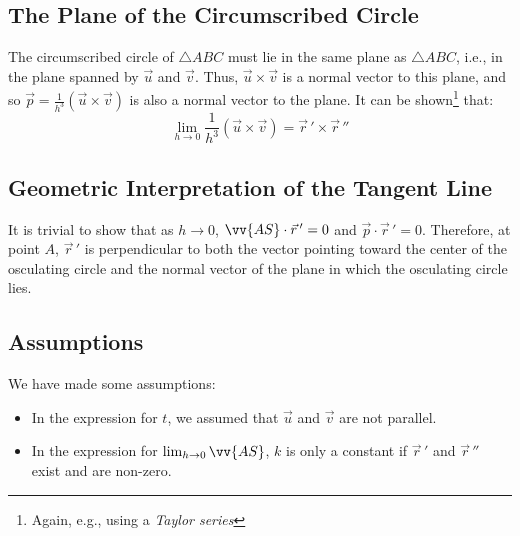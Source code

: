 	\subsection*{The Plane of the Circumscribed Circle}
	The circumscribed circle of $\triangle ABC$ must lie in the same plane as $\triangle ABC$, i.e., in the plane spanned by $\vec{u}$ and $\vec{v}$. Thus, $\vec{u} \times \vec{v}$ is a normal vector to this plane, and so $\vec{p} = \frac{1}{h^3}(\vec{u} \times \vec{v})$ is also a normal vector to the plane. It can be shown\footnote{Again, e.g., using a \textit{Taylor series}} that:
	\[
	\lim_{h \to 0} \frac{1}{h^3}(\vec{u} \times \vec{v}) = \vec{r}\,' \times \vec{r}\,''
	\]
	
	\subsection*{Geometric Interpretation of the Tangent Line}
	It is trivial to show that as $h \to 0$, $\vv{AS} \cdot \vec{r}\,' = 0$ and $\vec{p} \cdot \vec{r}\,' = 0$. Therefore, at point $A$, $\vec{r}\,'$ is perpendicular to both the vector pointing toward the center of the osculating circle and the normal vector of the plane in which the osculating circle lies.
	
	\subsection*{Assumptions}
	We have made some assumptions:
	\begin{itemize}
		\item In the expression for $t$, we assumed that $\vec{u}$ and $\vec{v}$ are not parallel.
		\item In the expression for $\lim_{h \to 0} \vv{AS}$, $k$ is only a constant if $\vec{r}\,'$ and $\vec{r}\,''$ exist and are non-zero.
	\end{itemize}
	
